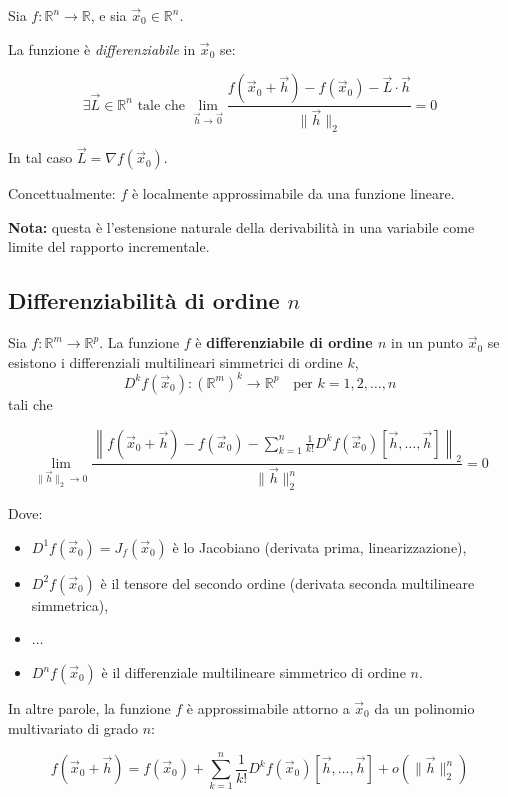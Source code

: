 \documentclass[12pt,a4paper]{article}
\begin{document}
Sia \( f : \mathbb{R}^n \to \mathbb{R} \), e sia \( \vec{x}_0 \in \mathbb{R}^n \).

La funzione è \emph{differenziabile} in \( \vec{x}_0 \) se:

\[
\exists \vec{L} \in \mathbb{R}^n \text{ tale che } 
\lim_{\vec{h} \to \vec{0}} \frac{f(\vec{x}_0 + \vec{h}) - f(\vec{x}_0) - \vec{L} \cdot \vec{h}}{\|\vec{h}\|_2} = 0
\]

In tal caso \( \vec{L} = \nabla f(\vec{x}_0) \).

Concettualmente: \( f \) è localmente approssimabile da una funzione lineare.

\textbf{Nota:} questa è l'estensione naturale della derivabilità in una variabile come limite del rapporto incrementale.


\subsection*{Differenziabilità di ordine \( n \)}

Sia \( f : \mathbb{R}^m \to \mathbb{R}^p \). La funzione \( f \) è \textbf{differenziabile di ordine \( n \)} in un punto \( \vec{x}_0 \) se esistono i differenziali multilineari simmetrici di ordine \( k \), 
\[ D^k f(\vec{x}_0) : (\mathbb{R}^m)^k \to \mathbb{R}^p \quad \text{per } k = 1, 2, \ldots, n \]
tali che

\[
\lim_{\|\vec{h}\|_2 \to 0} \frac{
\left\| f(\vec{x}_0 + \vec{h}) - f(\vec{x}_0) - \sum_{k=1}^n \frac{1}{k!} D^k f(\vec{x}_0)[\vec{h}, \ldots, \vec{h}] \right\|_2
}{
\|\vec{h}\|_2^n
} = 0
\]

Dove:

\begin{itemize}
    \item \( D^1 f(\vec{x}_0) = J_f(\vec{x}_0) \) è lo Jacobiano (derivata prima, linearizzazione),
    \item \( D^2 f(\vec{x}_0) \) è il tensore del secondo ordine (derivata seconda multilineare simmetrica),
    \item \( \ldots \)
    \item \( D^n f(\vec{x}_0) \) è il differenziale multilineare simmetrico di ordine \( n \).
\end{itemize}

In altre parole, la funzione \( f \) è approssimabile attorno a \( \vec{x}_0 \) da un polinomio multivariato di grado \( n \):

\[
f(\vec{x}_0 + \vec{h}) = f(\vec{x}_0) + \sum_{k=1}^n \frac{1}{k!} D^k f(\vec{x}_0)[\vec{h}, \ldots, \vec{h}] + o(\|\vec{h}\|_2^n)
\]
\end{document}
